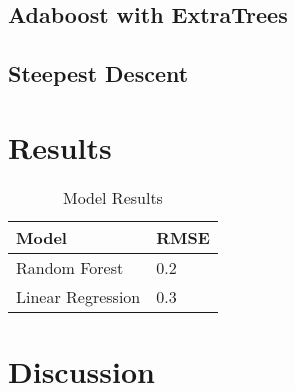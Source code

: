 \documentclass[11pt, oneside]{article}   	%
\begin{document}
\subsection{Adaboost with ExtraTrees} 
 
\subsection{Steepest Descent} 

\section{Results}

\begin{table}[]
\centering

\label{my-label}
\begin{tabular}{@{}ll@{}}
\toprule
\textbf{Model} & \textbf{RMSE} \\ \midrule
Random Forest  & 0.2  \\
Linear Regression & 0.3  \\ \bottomrule
\end{tabular}
\caption{Model Results}
\end{table}

\section{Discussion}

\end{document}
